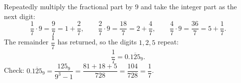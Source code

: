 Repeatedly multiply the fractional part by $9$ and take the integer part as the next digit:
\[
\dfrac{1}{7}\cdot9=\dfrac{9}{7}=1+\dfrac{2}{7},\qquad \dfrac{2}{7}\cdot9=\dfrac{18}{7}=2+\dfrac{4}{7},\qquad \dfrac{4}{7}\cdot9=\dfrac{36}{7}=5+\dfrac{1}{7} .
\]
The remainder $\dfrac{1}{7}$ has returned, so the digits $1,2,5$ repeat:
\[
\dfrac{1}{7}=\boxed{0.\overline{125}_9}.
\]
Check: $0.\overline{125}_9=\dfrac{125_9}{9^3-1}=\dfrac{81+18+5}{728}=\dfrac{104}{728}=\dfrac{1}{7}$.
